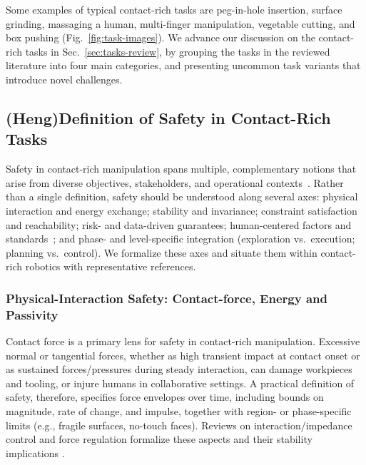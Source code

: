 \documentclass[Afour,sageh,times]{template/sagej}
\newcommand{\remember}[1]{{\color{gray} #1}}
\newcommand{\suggest}[1]{{\color{olive} (#1)}}
\begin{document}
Some examples of typical contact-rich tasks are peg-in-hole insertion, surface grinding, massaging a human, multi-finger manipulation, vegetable cutting, and box pushing (Fig.~\ref{fig:task-images}). 
We advance our discussion on the contact-rich tasks in Sec.~\ref{sec:tasks-review}, by grouping the tasks in the reviewed literature into four main categories, and presenting uncommon task variants that introduce novel challenges.





\subsection{\suggest{Heng}Definition of Safety in Contact-Rich Tasks}
Safety in contact-rich manipulation spans multiple, complementary notions that arise from diverse objectives, stakeholders, and operational contexts~\cite{wabersich2023data}. Rather than a single definition, safety should be understood along several axes: physical interaction and energy exchange; stability and invariance; constraint satisfaction and reachability; risk- and data-driven guarantees; human-centered factors and standards~\cite{ISO15066}; and phase- and level-specific integration (exploration vs.\ execution; planning vs.\ control). We formalize these axes and situate them within contact-rich robotics with representative references.



\subsubsection{Physical-Interaction Safety: Contact-force, Energy and Passivity}
Contact force is a primary lens for safety in contact-rich manipulation. Excessive normal or tangential forces, whether as high transient impact at contact onset or as sustained forces/pressures during steady interaction, can damage workpieces and tooling, or injure humans in collaborative settings. A practical definition of safety, therefore, specifies force envelopes over time, including bounds on magnitude, rate of change, and impulse, together with region- or phase-specific limits (e.g., fragile surfaces, no-touch faces). Reviews on interaction/impedance control and force regulation formalize these aspects and their stability implications \citep{ajoudani2018progress,calanca2015review}.
\end{document}
